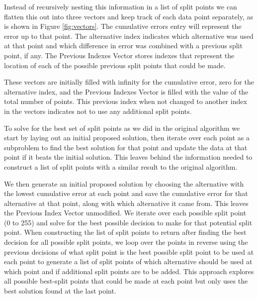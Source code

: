 \documentclass{article}
\begin{document}
Instead of recursively nesting this information in a list of split points we can flatten this out into three vectors and keep track of each data point separately, as is shown in Figure \ref{fig:vectors}. The cumulative errors entry will represent the error up to that point. The alternative index indicates which alternative was used at that point and which difference in error was combined with a previous split point, if any. The Previous Indexes Vector stores indexes that represent the location of each of the possible previous split points that could be made.

These vectors are initially filled with infinity for the cumulative error, zero for the alternative index, and the Previous Indexes Vector is filled with the value of the total number of points. This previous index when not changed to another index in the vectors indicates not to use any additional split points.

To solve for the best set of split points as we did in the original algorithm we start by laying out an initial proposed solution, then iterate over each point as a subproblem to find the best solution for that point and update the data at that point if it beats the initial solution. This leaves behind the information needed to construct a list of split points with a similar result to the original algorithm.

We then generate an initial proposed solution by choosing the alternative with the lowest cumulative error at each point and save the cumulative error for that alternative at that point, along with which alternative it came from. This leaves the Previous Index Vector unmodified. We iterate over each possible split point (0 to 255) and solve for the best possible decision to make for that potential split point. When constructing the list of split points to return after finding the best decision for all possible split points, we loop over the points in reverse using the previous decisions of what split point is the best possible split point to be used at each point to generate a list of split points of which alternative should be used at which point and if additional split points are to be added. This approach explores all possible best-split points that could be made at each point but only uses the best solution found at the last point.
\end{document}
